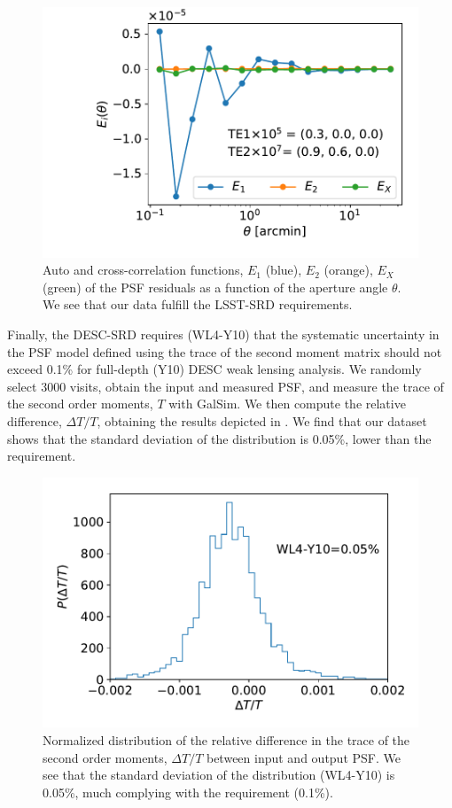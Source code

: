 \documentclass[\docopts]{\docclass}
\begin{document}
\begin{figure}
\centering
\includegraphics[width=0.85\columnwidth]{TEx}
\caption{Auto and cross-correlation functions, $E_{1}$ (blue), $E_{2}$ (orange), $E_{X}$ (green) of the PSF residuals as a function of the aperture angle $\theta$. We see that our data fulfill the LSST-SRD requirements.}
\label{fig:TEx}
\end{figure}

Finally, the DESC-SRD requires (WL4-Y10) that the systematic uncertainty in the PSF model defined using the trace of the second moment matrix should not exceed 0.1\% for full-depth (Y10) DESC weak lensing analysis. We randomly select 3000 visits, obtain the input and measured PSF, and measure the trace of the second order moments, $T$ with GalSim. We then compute the relative difference, $\Delta T/T$, obtaining the results depicted in . We find that our dataset shows that the standard deviation of the distribution is 0.05\%, lower than the requirement.
\begin{figure}
\centering
\includegraphics[width=0.85\columnwidth]{WL4-Y10}
\caption{Normalized distribution of the relative difference in the trace of the second order moments, $\Delta T/T$ between input and output PSF. We see that the standard deviation of the distribution (WL4-Y10) is 0.05\%, much complying with the requirement (0.1\%).}
\label{fig:WL4-Y10}
\end{figure}
\end{document}
